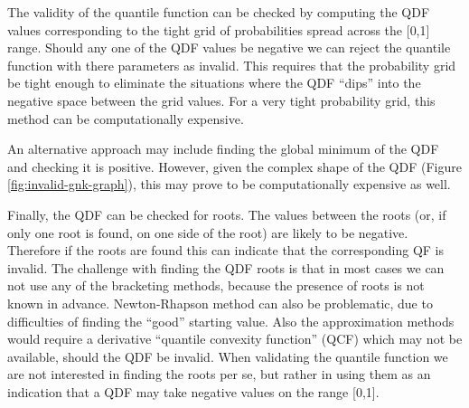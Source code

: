 \documentclass[
  12pt,
]{article}
\begin{document}
The validity of the quantile function can be checked by computing the QDF values corresponding to the tight grid of probabilities spread across the {[}0,1{]} range. Should any one of the QDF values be negative we can reject the quantile function with there parameters as invalid. This requires that the probability grid be tight enough to eliminate the situations where the QDF ``dips'' into the negative space between the grid values. For a very tight probability grid, this method can be computationally expensive.

An alternative approach may include finding the global minimum of the QDF and checking it is positive. However, given the complex shape of the QDF (Figure \ref{fig:invalid-gnk-graph}), this may prove to be computationally expensive as well.

Finally, the QDF can be checked for roots. The values between the roots (or, if only one root is found, on one side of the root) are likely to be negative. Therefore if the roots are found this can indicate that the corresponding QF is invalid. The challenge with finding the QDF roots is that in most cases we can not use any of the bracketing methods, because the presence of roots is not known in advance. Newton-Rhapson method can also be problematic, due to difficulties of finding the ``good'' starting value. Also the approximation methods would require a derivative ``quantile convexity function'' (QCF) which may not be available, should the QDF be invalid. When validating the quantile function we are not interested in finding the roots per se, but rather in using them as an indication that a QDF may take negative values on the range {[}0,1{]}.
\end{document}
